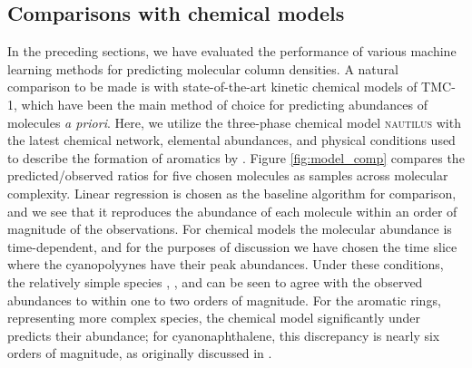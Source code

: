 \documentclass[twocolumn]{aastex63}
\begin{document}
\subsection{Comparisons with chemical models}

In the preceding sections, we have evaluated the performance of various machine learning methods for predicting molecular column densities. A natural comparison to be made is with state-of-the-art kinetic chemical models of TMC-1, which have been the main method of choice for predicting abundances of molecules \textit{a priori}. Here, we utilize the three-phase chemical model \textsc{nautilus} \citep{ruaud_gas_2016} with the latest chemical network, elemental abundances, and physical conditions used to describe the formation of aromatics by \citet{burkhardt_discovery_2021}. Figure \ref{fig:model_comp} compares the predicted/observed ratios for five chosen molecules as samples across molecular complexity. Linear regression is chosen as the baseline algorithm for comparison, and we see that it reproduces the abundance of each molecule within an order of magnitude of the observations. For chemical models the molecular abundance is time-dependent, and for the purposes of discussion we have chosen the time slice where the cyanopolyynes have their peak abundances. Under these conditions, the relatively simple species , , and  can be seen to agree with the observed abundances to within one to two orders of magnitude. For the aromatic rings, representing more complex species, the chemical model significantly under predicts their abundance; for cyanonaphthalene, this discrepancy is nearly six orders of magnitude, as originally discussed in \citet{mcguire_detection_2021}.
\end{document}
